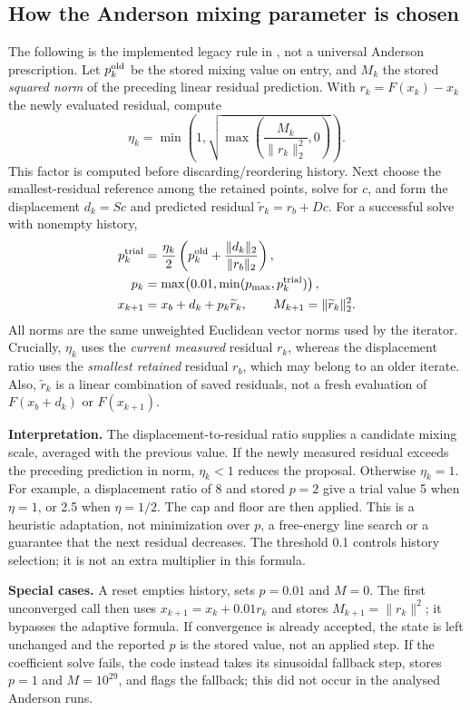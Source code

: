 \documentclass[11pt,a4paper]{article}
\begin{document}
\clearpage
\subsection{How the Anderson mixing parameter is chosen}
The following is the implemented legacy rule in
, not a universal Anderson prescription.
Let $p_k^{\rm old}$ be the stored mixing value on entry, and $M_k$ the stored
\emph{squared norm} of the preceding linear residual prediction. With
$r_k=F(x_k)-x_k$ the newly evaluated residual, compute
\begin{equation}
 \eta_k=\min\!\left(1,\sqrt{\max\!\left(\frac{M_k}{\|r_k\|_2^2},0\right)}\right).
\end{equation}
This factor is computed before discarding/reordering history. Next choose
the smallest-residual reference among the retained points, solve for $c$,
and form the displacement $d_k=Sc$ and predicted residual
$\widetilde r_k=r_b+Dc$. For a successful solve with nonempty history,
\begin{align}
 p_k^{\rm trial}&=\frac{\eta_k}{2}
       \left(p_k^{\rm old}+\frac{\|d_k\|_2}{\|r_b\|_2}\right),\\
 p_k&=\max\!\left(0.01,\min(p_{\max},p_k^{\rm trial})\right),\\
 x_{k+1}&=x_b+d_k+p_k\widetilde r_k,\qquad
 M_{k+1}=\|\widetilde r_k\|_2^2.
\end{align}
All norms are the same unweighted Euclidean vector norms used by the
iterator. Crucially, $\eta_k$ uses the \emph{current measured} residual
$r_k$, whereas the displacement ratio uses the \emph{smallest retained}
residual $r_b$, which may belong to an older iterate. Also,
$\widetilde r_k$ is a linear combination of saved residuals, not a fresh
evaluation of $F(x_b+d_k)$ or $F(x_{k+1})$.

\textbf{Interpretation.} The displacement-to-residual ratio supplies a
candidate mixing scale, averaged with the previous value. If the newly
measured residual exceeds the preceding prediction in norm, $\eta_k<1$
reduces the proposal. Otherwise $\eta_k=1$. For example, a displacement ratio
of 8 and stored $p=2$ give a trial value 5 when $\eta=1$, or 2.5 when
$\eta=1/2$. The cap and floor are then applied. This is a heuristic adaptation,
not minimization over $p$, a free-energy line search or a guarantee that the
next residual decreases. The threshold 0.1 controls history selection; it is
not an extra multiplier in this formula.

\textbf{Special cases.} A reset empties history, sets $p=0.01$ and $M=0$.
The first unconverged call then uses $x_{k+1}=x_k+0.01r_k$ and stores
$M_{k+1}=\|r_k\|^2$; it bypasses the adaptive formula. If convergence is
already accepted, the state is left unchanged and the reported $p$ is the
stored value, not an applied step. If the coefficient solve fails, the code
instead takes its sinusoidal fallback step, stores $p=1$ and $M=10^{29}$,
and flags the fallback; this did not occur in the analysed Anderson runs.
\end{document}
